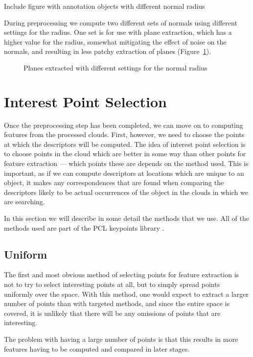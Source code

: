 \documentclass[11pt,a4paper]{kth-mag}
\begin{document}
Include figure with annotation objects with different normal radius

During preprocessing we compute two different sets of normals using different
settings for the radius. One set is for use with plane extraction, which has a
higher value for the radius, somewhat mitigating the effect of noise on the
normals, and resulting in less patchy extraction of planes
(Figure~\ref{fig:plane_normrad}).

\begin{figure}
  \centering
  
  \caption{Planes extracted with different settings for the normal radius}
  \label{fig:plane_normrad}
\end{figure}

\chapter{Interest Point Selection}
\label{chap:interest}
Once the preprocessing step has been completed, we can move on to computing
features from the processed clouds. First, however, we need to choose the points
at which the descriptors will be computed. The idea of interest point selection
is to choose points in the cloud which are better in some way than other points
for feature extraction --- which points these are depends on the method used.
This is important, as if we can compute descriptors at locations which are
unique to an object, it makes any correspondences that are found when comparing
the descriptors likely to be actual occurrences of the object in the clouds in
which we are searching.

In this section we will describe in some detail the methods that we use. All of
the methods used are part of the PCL keypoints library \cite{pcl_keypoints}.

\section{Uniform}
The first and most obvious method of selecting points for feature extraction is
not to try to select interesting points at all, but to simply spread points
uniformly over the space. With this method, one would expect to extract a larger
number of points than with targeted methods, and since the entire space is
covered, it is unlikely that there will be any omissions of points that are
interesting.

The problem with having a large number of points is that this results in more
features having to be computed and compared in later stages.
\end{document}
